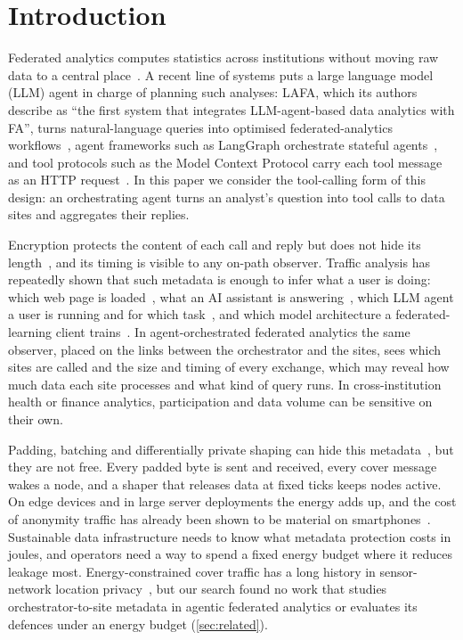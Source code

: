 \section{Introduction}\label{sec:intro}

Federated analytics computes statistics across institutions without moving raw data to a central place~\cite{wang2022federated,elkordy2023federated}. A recent line of systems puts a large language model (LLM) agent in charge of planning such analyses: LAFA, which its authors describe as ``the first system that integrates LLM-agent-based data analytics with FA'', turns natural-language queries into optimised federated-analytics workflows~\cite{ji2025lafa}, agent frameworks such as LangGraph orchestrate stateful agents~\cite{langgraph2026docs}, and tool protocols such as the Model Context Protocol carry each tool message as an HTTP request~\cite{mcp2026spec}. In this paper we consider the tool-calling form of this design: an orchestrating agent turns an analyst's question into tool calls to data sites and aggregates their replies.

Encryption protects the content of each call and reply but does not hide its length~\cite{rfc9846}, and its timing is visible to any on-path observer. Traffic analysis has repeatedly shown that such metadata is enough to infer what a user is doing: which web page is loaded~\cite{panchenko2016website,sirinam2018deep}, what an AI assistant is answering~\cite{weiss2024what,mcdonald2025whisper}, which LLM agent a user is running and for which task~\cite{zhang2025agentprint,pouryousef2026benchmark}, and which model architecture a federated-learning client trains~\cite{shuvo2025flare,shuvo2026flint}. In agent-orchestrated federated analytics the same observer, placed on the links between the orchestrator and the sites, sees which sites are called and the size and timing of every exchange, which may reveal how much data each site processes and what kind of query runs. In cross-institution health or finance analytics, participation and data volume can be sensitive on their own.

Padding, batching and differentially private shaping can hide this metadata~\cite{cai2014systematic,wang2017walkie,sabzi2024netshaper}, but they are not free. Every padded byte is sent and received, every cover message wakes a node, and a shaper that releases data at fixed ticks keeps nodes active. On edge devices and in large server deployments the energy adds up, and the cost of anonymity traffic has already been shown to be material on smartphones~\cite{hugenroth2023powering}. Sustainable data infrastructure needs to know what metadata protection costs in joules, and operators need a way to spend a fixed energy budget where it reduces leakage most. Energy-constrained cover traffic has a long history in sensor-network location privacy~\cite{kamat2005enhancing,shao2008towards}, but our search found no work that studies orchestrator-to-site metadata in agentic federated analytics or evaluates its defences under an energy budget (\cref{sec:related}).

